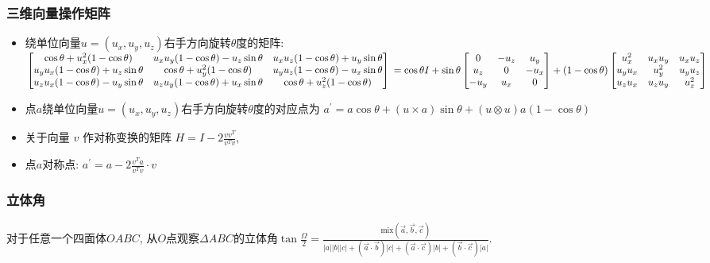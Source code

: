 \documentclass[landscape,a4paper]{article}
\begin{document}
\begin{spacing}{0.3}
\begin{multicols}{3}
\subsubsection{三维向量操作矩阵}
  \begin{itemize}
  \item 绕单位向量$u = (u_x, u_y, u_z)$右手方向旋转$\theta$度的矩阵: \\
    $
    \begin{bmatrix}
      \cos\theta + u_x^2 (1 - \cos\theta)    &    u_x u_y (1 - \cos\theta) - u_z \sin\theta    &    u_x u_z (1 - \cos\theta) + u_y \sin\theta \\
    u_y u_x (1 - \cos\theta) + u_z \sin\theta    &    \cos\theta + u_y^2 (1 - \cos\theta)    &    u_y u_z (1 - \cos\theta) - u_x \sin\theta \\
    u_z u_x (1 - \cos\theta) - u_y \sin\theta    &    u_z u_y (1 - \cos\theta) + u_x \sin\theta    &    \cos\theta + u_z^2 (1 - \cos\theta)
  \end{bmatrix} \\
  = \cos\theta I
  + \sin\theta
  \begin{bmatrix}
    0    &    -u_z    &    u_y \\
    u_z    &    0    &    -u_x \\
    -u_y    &    u_x    &    0
  \end{bmatrix}
  + (1 - \cos\theta)
  \begin{bmatrix}
    u_x ^ 2    &    u_x u_y    &    u_x u_z \\
    u_y u_x    &    u_y ^ 2    &    u_y u_z \\
    u_z u_x    &    u_z u_y    &    u_z ^ 2
  \end{bmatrix}
  $
  \item 点$a$绕单位向量$u = (u_x, u_y, u_z)$右手方向旋转$\theta$度的对应点为
  $a^\prime = a \cos\theta + (u \times a) \sin\theta + (u \otimes u) a (1 - \cos\theta)$
  \item 关于向量 $v$ 作对称变换的矩阵 $H = I - 2 \frac{v v^T}{v^T v}$,
  \item 点$a$对称点: $a^\prime = a - 2 \frac{v^T a}{v^T v} \cdot v$
  \end{itemize}
\subsubsection{立体角}
  对于任意一个四面体$OABC$,
  从$O$点观察$\Delta ABC$的立体角$\tan{\frac{\Omega}{2}} =
  \frac{\textrm{mix}(\overrightarrow{a}, \overrightarrow{b}, \overrightarrow{c}) }{
  |a||b||c|
  + (\overrightarrow{a} \cdot \overrightarrow{b}) |c|
  + (\overrightarrow{a} \cdot \overrightarrow{c}) |b|
  + (\overrightarrow{b} \cdot \overrightarrow{c}) |a|
}$.
	

\end{multicols}
\end{spacing}
\end{document}
